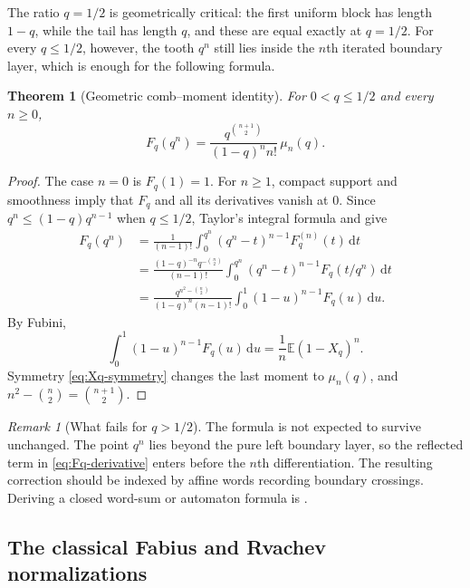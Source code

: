 \documentclass[11pt,a4paper,oneside]{article}
\newtheorem{theorem}{Theorem}[section]
\theoremstyle{definition}
\theoremstyle{remark}
\newtheorem{remark}[remark]{Remark}
\newcommand{\E}{\mathbb E}
\newcommand{\dd}{\,\mathrm d}
\begin{document}
The ratio $q=1/2$ is geometrically critical: the first uniform block has
length $1-q$, while the tail has length $q$, and these are equal exactly at
$q=1/2$.  For every $q\le1/2$, however, the tooth $q^n$ still lies inside the
$n$th iterated boundary layer, which is enough for the following formula.

\begin{theorem}[Geometric comb--moment identity]
\label{thm:comb-moment}
For $0<q\le1/2$ and every $n\ge0$,
\begin{equation}
 F_q(q^n)
 =\frac{q^{\binom{n+1}{2}}}{(1-q)^n n!}\,\mu_n(q).
 \label{eq:comb-moment}
\end{equation}
\end{theorem}

\begin{proof}
The case $n=0$ is $F_q(1)=1$.  For $n\ge1$, compact support and smoothness
imply that $F_q$ and all its derivatives vanish at $0$.  Since
$q^n\le(1-q)q^{n-1}$ when $q\le1/2$, Taylor's integral formula and
 give
\begin{align*}
 F_q(q^n)
 &=\frac1{(n-1)!}\int_0^{q^n}(q^n-t)^{n-1}F_q^{(n)}(t)\dd t\\
 &=\frac{(1-q)^{-n}q^{-\binom n2}}{(n-1)!}
   \int_0^{q^n}(q^n-t)^{n-1}F_q(t/q^n)\dd t\\
 &=\frac{q^{n^2-\binom n2}}{(1-q)^n(n-1)!}
   \int_0^1(1-u)^{n-1}F_q(u)\dd u.
\end{align*}
By Fubini,
\[
 \int_0^1(1-u)^{n-1}F_q(u)\dd u
 =\frac1n\E(1-X_q)^n.
\]
Symmetry \eqref{eq:Xq-symmetry} changes the last moment to $\mu_n(q)$, and
$n^2-\binom n2=\binom{n+1}{2}$.
\end{proof}

\begin{remark}[What fails for $q>1/2$]
The formula is not expected to survive unchanged.  The point $q^n$ lies beyond
the pure left boundary layer, so the reflected term in
\eqref{eq:Fq-derivative} enters before the $n$th differentiation.  The
resulting correction should be indexed by affine words recording boundary
crossings.  Deriving a closed word-sum or automaton formula is
.
\end{remark}

\subsection{The classical Fabius and Rvachev normalizations}
\end{document}
